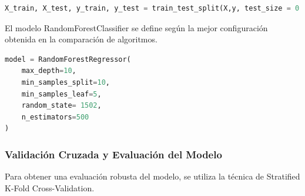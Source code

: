 \begin{lstlisting}[language=Python, caption=División de datos para entrenamiento y prueba, label=lst:train_test_split_RFC]
X_train, X_test, y_train, y_test = train_test_split(X,y, test_size = 0.2,random_state= 1502)
\end{lstlisting}

El modelo RandomForestClassifier se define según la mejor configuración obtenida en la comparación de algoritmos.


\begin{lstlisting}[language=Python, caption=Definición del modelo RandomForestRegressor, label=lst:def_RFC]
model = RandomForestRegressor( 
    max_depth=10, 
    min_samples_split=10, 
    min_samples_leaf=5,
    random_state= 1502,
    n_estimators=500
)
\end{lstlisting}

\subsubsection{Validación Cruzada y Evaluación del Modelo}

Para obtener una evaluación robusta del modelo, se utiliza la técnica de Stratified K-Fold Cross-Validation.

